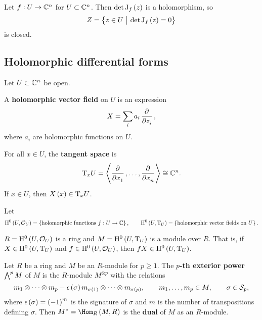 \begin{remark}
Let $ f : U \to \mathbb{C}^n $ for $ U \subset \mathbb{C}^n $. Then $ \det \J_f\br{z} $ is a holomorphism, so
$$ Z = \cbr{z \in U \st \det \J_f\br{z} = 0} $$
is closed.
\end{remark}

\subsection{Holomorphic differential forms}

Let $ U \subset \mathbb{C}^n $ be open.

\begin{definition}
A \textbf{holomorphic vector field} on $ U $ is an expression
$$ X = \sum_i a_i\dpd{}{z_i}, $$
where $ a_i $ are holomorphic functions on $ U $.
\end{definition}

For all $ x \in U $, the \textbf{tangent space} is
$$ \T_xU = \abr{\dpd{}{x_1}, \dots, \dpd{}{x_n}} \cong \CC^n. $$
If $ x \in U $, then $ X\br{x} \in \T_xU $.

\begin{notation}
Let
$$ \H^0\br{U, \OOO_U} = \cbr{\text{holomorphic functions} \ f : U \to \CC}, \qquad \H^0\br{U, \T_U} = \cbr{\text{holomorphic vector fields on} \ U}. $$
\end{notation}

\begin{remark*}
$ R = \H^0\br{U, \OOO_U} $ is a ring and $ M = \H^0\br{U, \T_U} $ is a module over $ R $. That is, if $ X \in \H^0\br{U, \T_U} $ and $ f \in \H^0\br{U, \OOO_U} $, then $ fX \in \H^0\br{U, \T_U} $.
\end{remark*}

\pagebreak

\begin{definition}
Let $ R $ be a ring and $ M $ be an $ R $-module for $ p \ge 1 $. The \textbf{$ p $-th exterior power} $ \textstyle\bigwedge^pM $ of $ M $ is the $ R $-module $ M^{\otimes p} $ with the relations
$$ m_1 \otimes \dots \otimes m_p - \epsilon\br{\sigma}m_{\sigma\br{1}} \otimes \dots \otimes m_{\sigma\br{p}}, \qquad m_1, \dots, m_p \in M, \qquad \sigma \in \SSS_p, $$
where $ \epsilon\br{\sigma} = \br{-1}^m $ is the signature of $ \sigma $ and $ m $ is the number of transpositions defining $ \sigma $. Then $ M^* = \Hom_R\br{M, R} $ is the \textbf{dual} of $ M $ as an $ R $-module.
\end{definition}



